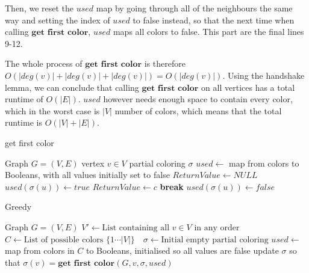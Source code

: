 \documentclass[a4paper]{article}
\newcommand{\algorithmicbreak}{\textbf{break}}
\newcommand{\BREAK}{\STATE \algorithmicbreak}
\begin{document}
Then, we reset the
$used$ map by going through all of the neighbours the same way and setting the
index of $used$ to false instead, so that the next time when calling
$\textbf{get first color}$, $used$ maps all colors to false. This part are the
final lines 9-12.

The whole process
of $\textbf{get first color}$ is therefore $O(|deg(v)|+|deg(v)| + |deg(v)|) =
O(|deg(v)|)$. Using the handshake lemma, we can conclude that calling
$\textbf{get first color}$ on all vertices has a total runtime of $O(|E|)$.
$used$ however needs enough space to contain every color, which in the worst
case is $|V|$ number of colors, which means that the total runtime is
$O(|V|+|E|)$.



\begin{algorithm}[H]
  \caption{get first color}
  \label{alg:gfc}
  \begin{algorithmic}[1]
      \REQUIRE Graph $G = (V,E)$
      \REQUIRE vertex $v \in V$
      \REQUIRE partial coloring $\sigma$
      \REQUIRE $used \leftarrow $ map from colors to Booleans, with all values
      initially set to false
        \STATE $ReturnValue \leftarrow NULL$
                \STATE $used(\sigma(u)) \leftarrow true$
            \ENDIF
        \ENDFOR
                \STATE $ReturnValue \leftarrow c$
                \BREAK
            \ENDIF
        \ENDFOR
                \STATE $used(\sigma(u)) \leftarrow false$
            \ENDIF
        \ENDFOR
  \end{algorithmic}
\end{algorithm}


\begin{algorithm}[H]
  \caption{Greedy}
  \label{alg:greedy}
  \begin{algorithmic}[1]
      \REQUIRE Graph $G = (V,E)$
      \STATE $V' \leftarrow \text{List containing all $v \in V$ in any order}$
      \STATE $C \leftarrow \text{List of possible colors $\{1 \cdots |V| \}$ }$
      \STATE $\sigma \leftarrow \text{Initial empty partial coloring}$
      \STATE $used \leftarrow $ map from colors in $C$ to Booleans, initialised
      so all values are false
        \STATE update $\sigma$ so that  $\sigma(v) = \textbf{get first color}(G,v,\sigma,used)$
    \ENDFOR
  \end{algorithmic}
\end{algorithm}
\end{document}
